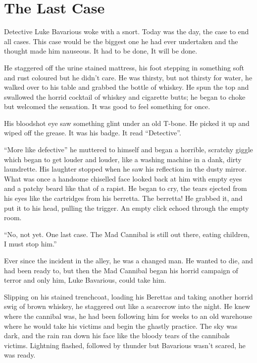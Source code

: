 \chapter{The Last Case}

Detective Luke Bavarious woke with a snort. Today was the day, the
case to end all cases. This case would be the biggest one he had
ever undertaken and the thought made him nauseous. It had to be
done, It will be done.



He staggered off the urine stained mattress, his foot stepping in
something soft and rust coloured but he didn't care. He was
thirsty, but not thirsty for water, he walked over to his table and
grabbed the bottle of whiskey. He spun the top and swallowed the
horrid cocktail of whiskey and cigarette butts; he began to choke
but welcomed the sensation. It was good to feel something for
once.



His bloodshot eye saw something glint under an old T-bone. He
picked it up and wiped off the grease. It was his badge. It read
``Detective''.

``More like defective'' he muttered to himself and began
a horrible, scratchy giggle which began to get louder and louder,
like a washing machine in a dank, dirty laundrette. His laughter
stopped when he saw his reflection in the dusty mirror. What was
once a handsome chiselled face looked back at him with empty eyes
and a patchy beard like that of a rapist. He began to cry, the
tears ejected from his eyes like the cartridges from his berretta.
The berretta! He grabbed it, and put it to his head, pulling the
trigger. An empty click echoed through the empty room.



``No, not yet. One last case. The Mad Cannibal is still out
there, eating children, I must stop him.''



Ever since the incident in the alley, he was a changed man. He
wanted to die, and had been ready to, but then the Mad Cannibal
began his horrid campaign of terror and only him, Luke Bavarious,
could take him.



Slipping on his stained trenchcoat, loading his Berettas and taking
another horrid swig of brown whiskey, he staggered out like a
scarecrow into the night. He knew where the cannibal was, he had
been following him for weeks to an old warehouse where he would
take his victims and begin the ghastly practice. The sky was dark,
and the rain ran down his face like the bloody tears of the
cannibals victims. Lightning flashed, followed by thunder but
Bavarious wasn't scared, he was ready.



